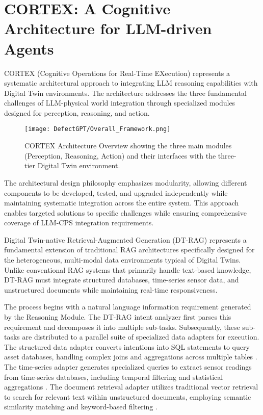 \section{CORTEX: A Cognitive Architecture for LLM-driven Agents}

CORTEX (Cognitive Operations for Real-Time EXecution) represents a systematic architectural approach to integrating LLM reasoning capabilities with Digital Twin environments. The architecture addresses the three fundamental challenges of LLM-physical world integration through specialized modules designed for perception, reasoning, and action.

\begin{figure}[htbp]
\centering
\texttt{[image: DefectGPT/Overall\_Framework.png]}
\caption{CORTEX Architecture Overview showing the three main modules (Perception, Reasoning, Action) and their interfaces with the three-tier Digital Twin environment.}
\label{fig:architecture_overview}
\end{figure}

The architectural design philosophy emphasizes modularity, allowing different components to be developed, tested, and upgraded independently while maintaining systematic integration across the entire system. This approach enables targeted solutions to specific challenges while ensuring comprehensive coverage of LLM-CPS integration requirements.

Digital Twin-native Retrieval-Augmented Generation (DT-RAG) represents a fundamental extension of traditional RAG architectures specifically designed for the heterogeneous, multi-modal data environments typical of Digital Twins. Unlike conventional RAG systems that primarily handle text-based knowledge, DT-RAG must integrate structured databases, time-series sensor data, and unstructured documents while maintaining real-time responsiveness.

The process begins with a natural language information requirement generated by the Reasoning Module. The DT-RAG intent analyzer first parses this requirement and decomposes it into multiple sub-tasks. Subsequently, these sub-tasks are distributed to a parallel suite of specialized data adapters for execution. The structured data adapter converts intentions into SQL statements to query asset databases, handling complex joins and aggregations across multiple tables \cite{scholak2021duorat}. The time-series adapter generates specialized queries to extract sensor readings from time-series databases, including temporal filtering and statistical aggregations \cite{yue2022ts2vec}. The document retrieval adapter utilizes traditional vector retrieval to search for relevant text within unstructured documents, employing semantic similarity matching and keyword-based filtering \cite{karpukhin2020dense}.

